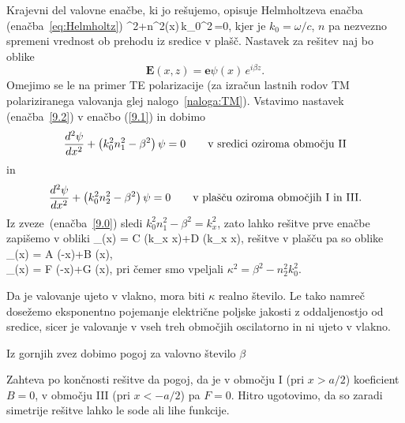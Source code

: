 Krajevni del valovne enačbe, ki jo rešujemo, opisuje Helmholtzeva enačba (enačba~\ref{eq:Helmholtz})
\beq
\nabla^{2}+n^2(x)\,k_{0}^{2}\,=0,
\label{9.1}
\eeq
kjer je $k_{0}=\omega/c$, $n$ pa nezvezno spremeni vrednost ob prehodu iz sredice v plašč. 
Nastavek za rešitev naj bo oblike 
\begin{equation}
{\mathbf E}(x,z)=\mathbf{e}\psi\left(x\right)\, e^{i\beta z}.
\label{9.2}
\end{equation}
Omejimo se le na primer TE polarizacije (za izračun lastnih rodov TM polariziranega
valovanja glej nalogo~\ref{naloga:TM}). Vstavimo nastavek (enačba~\ref{9.2}) v enačbo
(\ref{9.1}) in dobimo
\begin{equation}
\frac{d^{2}{\bf \psi}}{dx^{2}}+\left(k_{0}^{2}n_1^{2}-\beta^{2}\right){\bf \psi}=0
\qquad \textrm{v sredici oziroma obmo\v cju II} 
\label{9.3}
\end{equation}
in 
\begin{equation}
\frac{d^{2}{\bf \psi}}{dx^{2}}+\left(k_{0}^{2}n_2^{2}-\beta^{2}\right){\bf \psi}=0
\qquad \textrm{v plašču oziroma obmo\v cjih I in III.} 
\label{9.3}
\end{equation}
Iz zveze~(enačba~\ref{9.0}) sledi $k_0^2n_1^2-\beta^2=k_x^2$, zato lahko rešitve prve enačbe
zapišemo v obliki
\beq
\psi_{}(x) = C \cos(k_x x)+D \sin(k_x x),
\eeq
rešitve v plašču pa so oblike
\beq
\psi_{}(x) = A \exp(-\kappa x)+B \exp(\kappa x),\\
\psi_{}(x) = F \exp(-\kappa x)+G \exp(\kappa x),
\eeq
pri čemer smo vpeljali $\kappa^2= \beta^2-n_2^2k_0^2$.

Da je valovanje ujeto v vlakno, mora biti $\kappa$ realno število.
Le tako namreč dosežemo eksponentno pojemanje električne poljske jakosti 
z oddaljenostjo od sredice,
sicer je valovanje v vseh treh območjih oscilatorno in ni ujeto v vlakno. 

Iz gornjih zvez dobimo pogoj za valovno število $\beta$

Zahteva po končnosti rešitve da pogoj, da je v območju I (pri $x>a/2$) koeficient $B=0$, 
v območju III (pri $x<-a/2$) pa $F=0$. Hitro ugotovimo, da so zaradi simetrije rešitve
lahko le sode ali lihe funkcije. 


